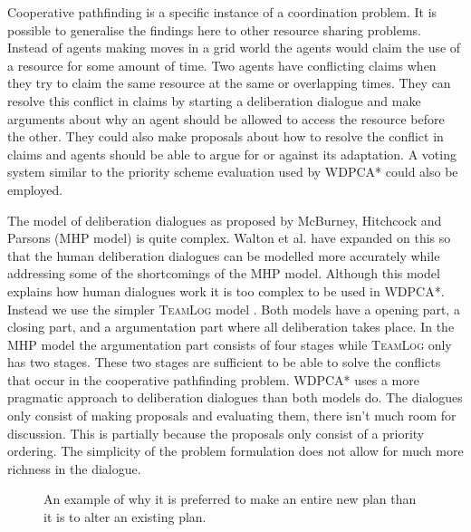 Cooperative pathfinding is a specific instance of a coordination problem. It is
possible to generalise the findings here to other resource sharing problems.
Instead of agents making moves in a grid world the agents would claim the use
of a resource for some amount of time. Two agents have conflicting claims when
they try to claim the same resource at the same or overlapping times. They can
resolve this conflict in claims by starting a deliberation dialogue and make
arguments about why an agent should be allowed to access the resource before
the other. They could also make proposals about how to resolve the conflict in
claims and agents should be able to argue for or against its adaptation. A
voting system similar to the priority scheme evaluation used by WDPCA* could
also be employed.

The model of deliberation dialogues as proposed by McBurney, Hitchcock and
Parsons (MHP model) \citep{mcburney2007} is quite complex. Walton et al.
\citep{walton2014} have expanded on this so that the human deliberation
dialogues can be modelled more accurately while addressing some of the
shortcomings of the MHP model. Although this model explains how human dialogues
work it is too complex to be used in WDPCA*. Instead we use the simpler
\textsc{TeamLog} model \citep{dunin-keplicz2011}. Both models have a
opening part, a closing part, and a argumentation part where all
deliberation takes place. In the MHP model the argumentation part consists of
four stages while \textsc{TeamLog} only has two stages. These two stages are
sufficient to be able to solve the conflicts that occur in the cooperative
pathfinding problem. WDPCA* uses a more pragmatic approach to deliberation
dialogues than both models do. The dialogues only consist of making proposals
and evaluating them, there isn't much room for discussion. This is partially
because the proposals only consist of a priority ordering. The simplicity of
the problem formulation does not allow for much more richness in the dialogue.

\begin{figure}[t]
    \centering
    \def\svgscale{.7}
    
    \caption{An example of why it is preferred to make an entire new plan than
    it is to alter an existing plan.}
    \label{fig:repair}
\end{figure}

